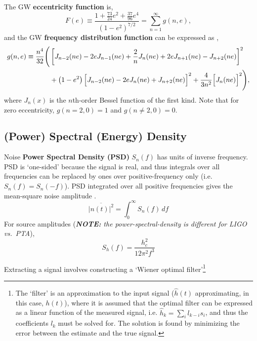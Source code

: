 \documentclass[10pt, oneside, onecolumn]{article}   	%
\begin{document}
            The GW \textbf{eccentricity function} is,
            \begin{equation}
                \label{eq:}
                F(e) \equiv \frac{1 + \frac{73}{24} e^2 + \frac{37}{96} e^4}{\left( 1 - e^2\right)^{7/2}} = \sum_{n=1}^\infty g(n,e),
            \end{equation}
            and the GW \textbf{frequency distribution function} can be expressed as \citep[][Eq.~2.4]{enoki2007a},
            \begin{equation}
            \begin{split}
                \label{eq:freq_dist_func}
                g(n,e) \equiv \frac{n^4}{32} \Biggl(& \left[ J_{n-2}(ne) - 2eJ_{n-1}(ne) + \frac{2}{n} J_n (ne) + 2e J_{n+1} (ne) - J_{n+2} (ne) \vphantom{\frac{2}{n}}\right]^2 \\
                &+ \left(1-e^2\right) \Bigl[J_{n-2}(ne) - 2eJ_n(ne) + J_{n+2}(ne)\Bigr]^2 + \frac{4}{3n^2}\Bigl[J_n(ne)\Bigr]^2 \Biggr),
            \end{split}
            \end{equation}
            where $J_n(x)$ is the $n$th-order Bessel function of the first kind.  Note that for zero eccentricity, $g(n=2,0) = 1$ and $g(n\neq2, 0) = 0$.

        \subsection{(Power) Spectral (Energy) Density }
            Noise \textbf{Power Spectral Density (PSD)} $S_n(f)$ has units of inverse frequency.  PSD is `one-sided' because the signal is real, and thus integrals over all frequencies can be replaced by ones over positive-frequency only (i.e.~$S_n(f) = S_n(-f)$).  PSD integrated over all positive frequencies gives the mean-square noise amplitude \citep{moore2015}.
            \begin{equation}
                \overline{|n(t)|^2} = \int_0^\infty S_n(f) \, df
            \end{equation}
            For source amplitudes \citep{rosado2015} (\textit{\textbf{NOTE:} the power-spectral-density is different for LIGO vs.~PTA}),
            \begin{equation}
                S_h(f) = \frac{h_c^2}{12 \pi^2 f^3}
            \end{equation}

            Extracting a signal involves constructing a `Wiener optimal filter'\footnote{The `filter' is an approximation to the input signal ($\hat{h}(t)$ approximating, in this case, $h(t)$), where it is assumed that the optimal filter can be expressed as a linear function of the measured signal, i.e. $\hat{h}_k = \sum_i l_{k-i} s_i$, and thus the coefficients $l_k$ must be solved for.  The solution is found by minimizing the error between the estimate and the true signal.}
\end{document}
